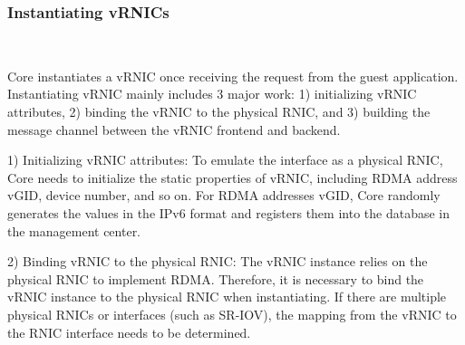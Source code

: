 
\subsubsection{\textbf{Instantiating vRNICs}}
\
\noindent


\sys Core instantiates a vRNIC  once receiving the request from the guest application. Instantiating vRNIC mainly includes 3 major work: 1) initializing vRNIC attributes, 2) binding the vRNIC to the physical RNIC, and 3) building the message channel between the vRNIC frontend and backend.


1) Initializing vRNIC attributes: To emulate the interface as a physical RNIC, \sys Core needs to initialize the static properties of vRNIC, including RDMA address vGID, device number, and so on. For RDMA addresses vGID, \sys Core randomly generates the values in the IPv6 format and registers them into the database in the management center.


2) Binding vRNIC to the physical RNIC: The vRNIC instance relies on the physical RNIC to implement RDMA. Therefore, it is necessary to bind the vRNIC instance to the physical RNIC when instantiating. If there are multiple physical RNICs or interfaces (such as SR-IOV), the mapping from the vRNIC to the RNIC interface needs to be determined.


